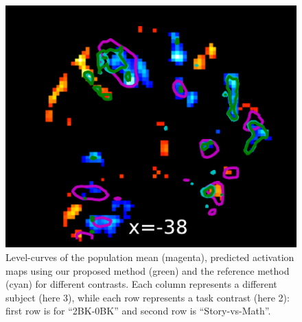 \begin{figure}[!htbp]
  \hspace{-.2cm}
  \includegraphics[width=.33\linewidth]{figures/brain_STORY-MATH_137633_01bags.pdf}
  \caption{Level-curves of the population mean (magenta), predicted activation
    maps using our proposed method (green) and the reference method \citep{tavor2016task}
    (cyan) for different contrasts. Each column represents a different subject (here 3),
    while each row represents a task contrast (here 2): first row is for ``2BK-0BK'' and second row is ``Story-vs-Math''.}
  \label{fig:zmaps}
\end{figure}

